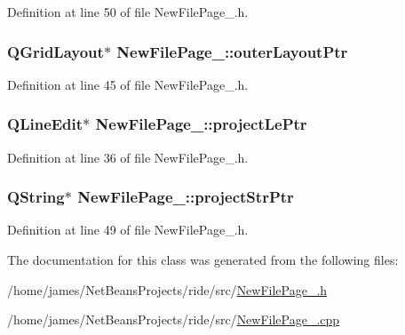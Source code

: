 Definition at line 50 of file New\-File\-Page\-\_.\-h.

\hypertarget{class_new_file_page__4_a4b4a6d04dd80df11c8acaf2939a5000e}{
\subsubsection[{outer\-Layout\-Ptr}]{\setlength{\rightskip}{0pt plus 5cm}Q\-Grid\-Layout$\ast$ New\-File\-Page\-\_\-::outer\-Layout\-Ptr\hspace{0.3cm}{\ttfamily [private]}}}\label{class_new_file_page__4_a4b4a6d04dd80df11c8acaf2939a5000e}


Definition at line 45 of file New\-File\-Page\-\_.\-h.

\hypertarget{class_new_file_page__4_a1373433031aa8284d1e4b597b2b3ef5f}{
\subsubsection[{project\-Le\-Ptr}]{\setlength{\rightskip}{0pt plus 5cm}Q\-Line\-Edit$\ast$ New\-File\-Page\-\_\-::project\-Le\-Ptr\hspace{0.3cm}{\ttfamily [private]}}}\label{class_new_file_page__4_a1373433031aa8284d1e4b597b2b3ef5f}


Definition at line 36 of file New\-File\-Page\-\_.\-h.

\hypertarget{class_new_file_page__4_ab1f30508de73c5748ed96c7acd2c0821}{
\subsubsection[{project\-Str\-Ptr}]{\setlength{\rightskip}{0pt plus 5cm}Q\-String$\ast$ New\-File\-Page\-\_\-::project\-Str\-Ptr\hspace{0.3cm}{\ttfamily [private]}}}\label{class_new_file_page__4_ab1f30508de73c5748ed96c7acd2c0821}


Definition at line 49 of file New\-File\-Page\-\_.\-h.



The documentation for this class was generated from the following files\-:\begin{DoxyCompactItemize}
\item 
/home/james/\-Net\-Beans\-Projects/ride/src/\hyperlink{_new_file_page__4_8h}{New\-File\-Page\-\_.\-h}\item 
/home/james/\-Net\-Beans\-Projects/ride/src/\hyperlink{_new_file_page__4_8cpp}{New\-File\-Page\-\_.\-cpp}\end{DoxyCompactItemize}

